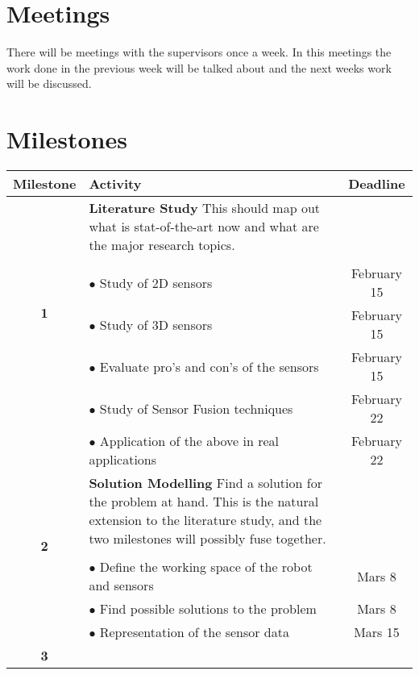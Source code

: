 \documentclass[a4paper, 10pt]{article}
\begin{document}
\section{Meetings}
There will be meetings with the supervisors once a week. In this meetings the work done in
the previous week will be talked about and the next weeks work will be discussed.  


\section{Milestones}
\begin{tabular}{| c | p{10.5cm} || c |}
    \hline
        Milestone   &   Activity    &   Deadline \\
    \hline
    \hline
        \multirow{6}{*}{\textbf{1}}  &   
                        \textbf{Literature Study} This should map out what is
                        stat-of-the-art now and what are the major research topics. & \\
                        & & \\
                        & $\bullet$ Study of 2D sensors & February 15 \\ 
                        & $\bullet$ Study of 3D sensors & February 15 \\ 
                        & $\bullet$ Evaluate pro's and con's of the sensors & February 15 \\ 
                        & $\bullet$ Study of Sensor Fusion techniques & February 22 \\
                        & $\bullet$ Application of the above in real applications & February 22 \\
        \hline
        \multirow{4}{*}{\textbf{2}}  &   
                        \textbf{Solution Modelling} Find a solution for the problem
                        at hand. This is the natural extension to the literature study,
                        and the two milestones will possibly fuse together. & \\
                        & & \\                        
                        & $\bullet$ Define the working space of the robot and sensors & Mars 8 \\
                        & $\bullet$ Find possible solutions to the problem & Mars 8 \\
                        & $\bullet$ Representation of the sensor data & Mars 15 \\
        \hline
        \multirow{8}{*}{\textbf{3}}  & 

\end{tabular}
\end{document}
